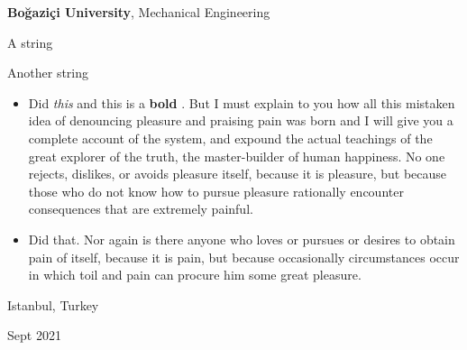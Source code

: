 \documentclass[10pt, letterpaper]{article}
\newenvironment{summary}{
    \begin{description}[
        topsep=0.10 cm,
        parsep=0.10 cm,
        partopsep=0pt,
        itemsep=0pt,
        leftmargin=0.4 cm + 10pt
    ]
}{
    \end{description}
} %
\newenvironment{highlights}{
    \begin{itemize}[
        topsep=0.10 cm,
        parsep=0.10 cm,
        partopsep=0pt,
        itemsep=0pt,
        leftmargin=0.4 cm + 10pt
    ]
}{
    \end{itemize}
} %
\newenvironment{threecolentry}[3][]{
    \onecolentry
    \def\thirdColumn{#3}
    \setcolumnwidth{1 cm, \fill, 4.5 cm}
    \begin{paracol}{3}
    {\raggedright #2} \switchcolumn
}{
    \switchcolumn \raggedleft \thirdColumn
    \end{paracol}
    \endonecolentry
} %
\let\hrefWithoutArrow\href
\renewcommand{\href}[2]{\hrefWithoutArrow{#1}{\ifthenelse{\equal{#2}{}}{ }{#2 }\raisebox{.15ex}{\footnotesize \faExternalLink*}}}
\begin{document}
        \vspace{0.2 cm}

        \begin{threecolentry}{\textbf{}}{
            Istanbul, Turkey

        Sept 2021
        }
            \textbf{Boğaziçi University}, Mechanical Engineering
            \begin{summary}
                \item A string
                \item Another string
            \end{summary}
            \begin{highlights}
                \item Did \textit{this} and this is a \textbf{bold} \href{https://example.com}{link}. But I must explain to you how all this mistaken idea of denouncing pleasure and praising pain was born and I will give you a complete account of the system, and expound the actual teachings of the great explorer of the truth, the master-builder of human happiness. No one rejects, dislikes, or avoids pleasure itself, because it is pleasure, but because those who do not know how to pursue pleasure rationally encounter consequences that are extremely painful.
                \item Did that. Nor again is there anyone who loves or pursues or desires to obtain pain of itself, because it is pain, but because occasionally circumstances occur in which toil and pain can procure him some great pleasure.
            \end{highlights}
        \end{threecolentry}

        \vspace{0.2 cm}
\end{document}
